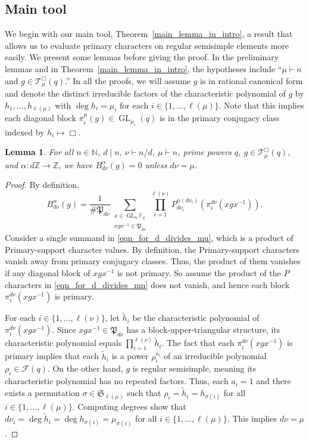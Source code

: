 \documentclass[10pt]{article}
\newtheorem{lemma}[theorem]{Lemma}
\theoremstyle{definition}
\DeclareMathOperator{\GL}{GL}
\newcommand{\F}{\mathbb{F}}
\newcommand{\CF}{\mathcal{F}}
\newcommand{\N}{\mathbb{N}}
\newcommand{\FS}{\mathfrak{S}}
\newcommand{\CT}{\mathcal{T}}
\newcommand{\Z}{\mathbb{Z}}
\newcommand{\para}{\mathfrak{P}}
\begin{document}
\subsection{Main tool} \label{reg_ss}

We begin with our main tool, Theorem~\ref{main_lemma_in_intro}, a result that allows us to evaluate primary characters on regular semisimple elements more easily.
We present some lemmas before giving the proof.
In the preliminary lemmas and in Theorem~\ref{main_lemma_in_intro}, the hypotheses include ``\(\mu \vdash n\) and \(g \in \CT_\mu^\Box (q)\).''
In all the proofs, we will assume \(g\) is in rational canonical form and denote the distinct irreducible factors of the characteristic polynomial of \(g\) by \(h_1,\ldots,h_{\ell(\mu)}\) with \(\deg h_i = \mu_i\) for each \(i \in \{1,\ldots,\ell(\mu)\}\).
Note that this implies each diagonal block \(\pi_i^\mu (g) \in \GL_{\mu_i} (q)\) is in the primary conjugacy class indexed by \(h_i \mapsto \Box\).


\begin{lemma}
\label{d_divides_mu}
For all \(n \in \N\), \(d \mid n\), \(\nu \vdash n / d\), \(\mu \vdash n\), prime powers \(q\), \(g \in \CT_\mu^\Box (q)\), and \(\alpha : d \Z \to \Z\), we have \(B_{d\nu}^\alpha(g) = 0\) unless \(d \nu = \mu\).
\end{lemma}
\begin{proof}
By definition,
\begin{equation}
\label{eqn_for_d_divides_mu}
B_{d \nu}^\alpha (g)
=
\frac{1}{\#\para_{d \nu}}
\sum_{\substack{x \in \GL_n \F_q \\ xgx^{-1} \in \para_{d \nu}}}
\prod_{i = 1}^{\ell(\nu)}
P_{d \nu_i}^{\alpha (d \nu_i)} \left (\pi^{d \nu}_i (xgx^{-1}) \right ).
\end{equation}
Consider a single summand in \eqref{eqn_for_d_divides_mu}, which is a product of Primary-support character values.
By definition, the Primary-support characters vanish away from primary conjugacy classes.
Thus, the product of them vanishes if any diagonal block of \(xgx^{-1}\) is not primary.
So assume the product of the $P$ characters in \eqref{eqn_for_d_divides_mu} does not vanish, and hence each block \(\pi_i^{d \nu} (xgx^{-1})\) is primary.

For each \(i \in \{1,\ldots,\ell(\nu)\}\), let \(\tilde{h}_i\) be the characteristic polynomial of \(\pi^{d \nu}_i (xgx^{-1})\).
Since \(xgx^{-1} \in \para_{d \nu}\) has a block-upper-triangular structure, its characteristic polynomial equals \(\prod_{i=1}^{\ell(\nu)} \tilde{h}_i\).
The fact that each \(\pi^{d \nu}_i ( xgx^{-1})\) is primary implies that each \(\tilde{h}_i\) is a power \(\rho_i^{a_i}\) of an irreducible polynomial \(\rho_i \in \CF (q)\).
On the other hand, \(g\) is regular semisimple, meaning its characteristic polynomial has no repeated factors.
Thus, each \(a_i = 1\) and there exists a permutation \(\sigma \in \FS_{\ell(\mu)}\) such that \(\rho_i = \tilde{h}_i = h_{\sigma(i)}\) for all \(i \in \{1,\ldots,\ell(\mu)\}\).
Computing degrees show that \(d \nu_i = \deg \tilde{h}_i = \deg h_{\sigma(i)} = \mu_{\sigma(i)}\) for all \(i \in \{1,\ldots,\ell(\mu)\}\).
This implies \(d \nu = \mu\).
\end{proof}
\end{document}
